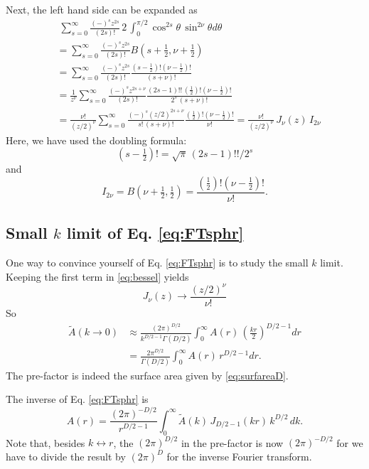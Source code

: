 \documentclass[preprint]{revtex4-1}
\numberwithin{equation}{subsection}
\numberwithin{table}{section}
\begin{document}
Next, the left hand side can be expanded as
%
\begin{align*}
& \;
  \sum_{s = 0}^\infty
  \frac{ (-)^s z^{2s} } { (2s)! }
  \,
  2 \, \int_0^{\pi/2} \cos^{2s} \theta \, \sin^{2\nu} \theta d \theta
  \\
&=
  \sum_{s = 0}^\infty
  \frac{ (-)^s z^{2s} } { (2s)! }
  B(s+\tfrac 1 2, \nu + \tfrac 1 2)
  \\
&=
  \sum_{s = 0}^\infty
  \frac{ (-)^s z^{2s} } { (2s)! }
  \frac{ (s-\tfrac 1 2)! (\nu - \tfrac 1 2)! }
       {  (s + \nu)!    }
  \\
&=
  \frac{1}{z^\nu}
  \sum_{s = 0}^\infty
  \frac{ (-)^s z^{2s + \nu} } { (2s)! }
  \frac{ (2s-1)!! \, (\tfrac 1 2)! (\nu - \tfrac 1 2)! }
      { 2^s \, (s + \nu)!    }
\\
&=
  \frac{\nu!}{(z/2)^\nu}
  \sum_{s = 0}^\infty
  \frac{ (-)^s (z/2)^{2s + \nu} } { s! \, (s + \nu)! }
  \frac{ (\tfrac 1 2)! (\nu - \tfrac 1 2)! }
       { \nu!    }
=
\frac{\nu!}{(z/2)^\nu} \, J_\nu(z) \, I_{2\nu}
\end{align*}
Here, we have used the doubling formula:
\begin{equation}
  (s - \tfrac 1 2)! = \sqrt\pi \, (2 s - 1)!! / 2^s
\end{equation}
and
\[
  I_{2\nu}
=
B(\nu + \tfrac{1}{2}, \tfrac{1}{2})
=
\frac{ (\tfrac 1 2)! (\nu - \tfrac 1 2)! }
       { \nu!    }.
\]



\subsection{Small $k$ limit of Eq. \eqref{eq:FTsphr}}



One way to convince yourself of Eq. \eqref{eq:FTsphr} is to study the small $k$ limit.
%
Keeping the first term in \eqref{eq:bessel} yields
\[
  J_\nu(z) \rightarrow \frac{ (z/2)^\nu }{ \nu! }
\]
So
%
\begin{align*}
\tilde A(k \rightarrow 0)
&\approx
\frac{ (2 \pi)^{D/2} } { k^{D/2 - 1} \Gamma(D/2) }
\int_0^\infty A(r) \, \left( \frac{k r}{2} \right)^{D/2 - 1} dr \\
&=
\frac{ 2 \pi^{D/2} } { \Gamma(D/2) }
\int_0^\infty A(r) \, r^{D/2 - 1} dr.
\end{align*}
%
The pre-factor is indeed the surface area
given by \eqref{eq:surfareaD}.


The inverse of Eq. \eqref{eq:FTsphr} is
\begin{equation}
A(r)
=
\frac{ (2\pi)^{-D/2} } { r^{D/2 - 1} }
\int_0^\infty \tilde{A}(k) \, J_{D/2-1}(kr) \, k^{D/2} \, dk.
\label{eq:invFTsphr}
\end{equation}
Note that, besides $k \leftrightarrow r$,
the $(2\pi)^{D/2}$ in the pre-factor is now $(2\pi)^{-D/2}$
for we have to divide the result by $(2\pi)^D$
for the inverse Fourier transform.
\end{document}
